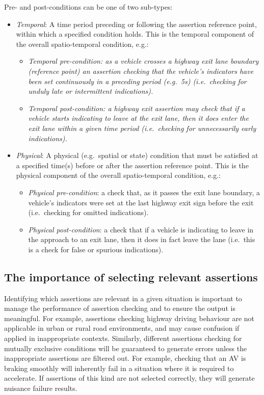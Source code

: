 Pre- and post-conditions can be one of two sub-types:
\begin{itemize}
	\item \textit{Temporal}: A time period preceding or following the assertion reference point, within which a specified condition holds. This is the temporal component of the overall spatio-temporal condition, e.g.:%
	\begin{itemize}
		\item \textit{Temporal pre-condition: as a vehicle crosses a highway exit lane boundary (reference point) an assertion checking that the vehicle's indicators have been set continuously in a preceding period (e.g.\ 5s) (i.e.\ checking for unduly late or intermittent indications).}
		\item\textit{Temporal post-condition: a highway exit assertion may check that if a vehicle starts indicating to leave at the exit lane, then it does enter the exit lane within a given time period (i.e.\ checking for unnecessarily early indications).}
	\end{itemize}
	
	\item \textit{Physical}: A physical (e.g.\ spatial or state) condition that must be satisfied at a specified time(s) before or after the assertion reference point. This is the physical component of the overall spatio-temporal condition, e.g.:%
	\begin{itemize}
		\item \textit{Physical pre-condition}: a check that, as it passes the exit lane boundary, a vehicle's indicators were set at the last highway exit sign before the exit (i.e.\ checking for omitted indications).
		\item \textit{Physical post-condition}: a check that if a vehicle is indicating to leave in the approach to an exit lane, then it does in fact leave the lane (i.e.\ this is a check for false or spurious indications).
	\end{itemize} 
\end{itemize}

\subsection{The importance of selecting relevant assertions} \label{assertion_triggers}
Identifying which assertions are relevant in a given situation is important to manage the performance of assertion checking and to ensure the output is meaningful. For example, assertions checking highway driving behaviour are not applicable in urban or rural road environments, and may cause confusion if applied in inappropriate contexts. 
Similarly, different assertions checking for mutually exclusive conditions will be guaranteed to generate errors unless the inappropriate assertions are filtered out. For example, checking that an AV is braking smoothly will inherently fail in a situation where it is required to accelerate. If assertions of this kind are not selected correctly, they will generate nuisance failure results. 

